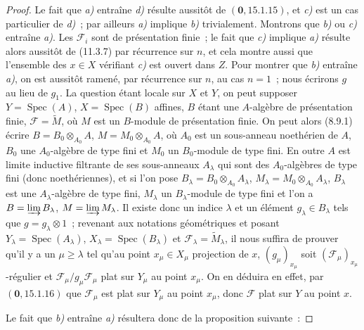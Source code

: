 \begin{proof}
Le fait que \emph{a)} entraîne \emph{d)} résulte aussitôt de $(\mathbf 0,15.1.15)$, et \emph{c)} est
un cas particulier de \emph{d)}~; par ailleurs \emph{a)} implique \emph{b)} trivialement. Montrons
que \emph{b)} ou \emph{c)} entraîne \emph{a)}. Les $\mathcal F_i$ sont de présentation finie~; le
fait que \emph{c)} implique \emph{a)} résulte alors aussitôt de (11.3.7) par récurrence sur
$n$, et cela montre aussi que l'ensemble des $x\in X$ vérifiant \emph{c)} est ouvert
dans $Z$. Pour montrer que \emph{b)} entraîne \emph{a)}, on est aussitôt ramené, par
récurrence sur $n$, au cas $n=1$~; nous écrirons $g$ au lieu de $g_1$. La
question étant locale sur $X$ et $Y$, on peut supposer
$Y=\operatorname{Spec}(A)$, $X=\operatorname{Spec}(B)$ affines, $B$ étant une
$A$-algèbre de présentation finie, $\mathcal F=\widetilde M$, où $M$ est un
$B$-module de présentation finie. On peut alors (8.9.1) écrire
$B=B_0\otimes_{A_0}A$, $M=M_0\otimes_{A_0}A$, où $A_0$ est un sous-anneau
noethérien de $A$, $B_0$ une $A_0$-algèbre de type fini et $M_0$ un
$B_0$-module de type fini. En outre $A$ est limite inductive filtrante de ses
sous-anneaux $A_\lambda$ qui sont des $A_0$-algèbres de type fini (donc
noethériennes), et si l'on pose
$B_\lambda=B_0\otimes_{A_0}A_\lambda$,
$M_\lambda=M_0\otimes_{A_0}A_\lambda$, $B_\lambda$ est une
$A_\lambda$-algèbre de type fini, $M_\lambda$ un $B_\lambda$-module de type
fini et l'on a $B=\varinjlim B_\lambda$, $M=\varinjlim M_\lambda$. Il existe
donc un indice $\lambda$ et un élément $g_\lambda\in B_\lambda$ tels que
$g=g_\lambda\otimes1$~; revenant aux notations géométriques et posant
$Y_\lambda=\operatorname{Spec}(A_\lambda)$,
$X_\lambda=\operatorname{Spec}(B_\lambda)$ et
$\mathcal F_\lambda=\widetilde{M}_\lambda$, il nous suffira de prouver qu'il y
a un $\mu\geq\lambda$ tel qu'au point $x_\mu\in X_\mu$ projection de $x$,
$(g_\mu)_{x_\mu}$ soit $(\mathcal F_\mu)_{x_\mu}$-régulier et
$\mathcal F_\mu/g_\mu\mathcal F_\mu$ plat sur $Y_\mu$ au point $x_\mu$. On en
déduira en effet, par $(\mathbf 0,15.1.16)$ que $\mathcal F_\mu$ est plat sur
$Y_\mu$ au point $x_\mu$, donc $\mathcal F$ plat sur $Y$ au point $x$.

Le fait que \emph{b)} entraîne \emph{a)} résultera donc de la proposition suivante~:


\end{proof}
